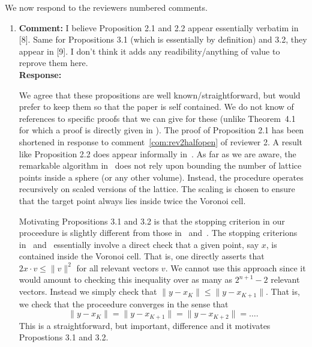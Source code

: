\documentclass[a4paper,10pt]{article}
\begin{document}
We now respond to the reviewers numbered comments.

\begin{enumerate}

\item\textbf{Comment:} 
I believe Proposition 2.1 and 2.2 appear essentially verbatim in [8]. Same for Propositions
3.1 (which is essentially by definition) and 3.2, they appear in [9]. I don’t think it adds any
readibility/anything of value to reprove them here.
\\\textbf{Response:}

We agree that these propositions are well known/straightforward, but would prefer to keep them so that the paper is self contained. We do not know of references to specific proofs that we can give for these (unlike Theorem~4.1 for which a proof is directly given in \cite[Theorem~3]{ConwaySloane1992_voronoi_lattice_3d_obtuse_superbases}).  The proof of Proposition 2.1 has been shortened in response to comment~\ref{com:rev2halfopen} of reviewer 2.  A result like Proposition 2.2 does appear informally in~\cite[Sec~5]{Shalvi_iterativeslicer_2009}.  As far as we are aware, the remarkable algorithm in~\cite{MicciancioVoulgaris_deterministic_jv_2013} does not rely upon bounding the number of lattice points inside a sphere (or any other volume).  Instead, the procedure operates recursively on scaled versions of the lattice.  The scaling is chosen to ensure that the target point always lies inside twice the Voronoi cell. 

Motivating Propositions 3.1 and 3.2 is that the stopping criterion in our proceedure is slightly different from those in~\cite{Shalvi_iterativeslicer_2009} and~\cite{MicciancioVoulgaris_deterministic_jv_2013}.  The stopping criterions in~\cite{Shalvi_iterativeslicer_2009} and~\cite{MicciancioVoulgaris_deterministic_jv_2013} essentially involve a direct check that a given point, say $x$, is contained inside the Voronoi cell.  That is, one directly asserts that $2 x \cdot v \leq \|v\|^2$ for all relevant vectors $v$.  We cannot use this approach since it would amount to checking this inequality over as many as $2^{n+1}-2$ relevant vectors.  Instead we simply check that $\|y - x_K\| \leq \|y - x_{K+1}\|$.  That is, we check that the proceedure converges in the sense that 
\[
\|y - x_K\| = \|y - x_{K+1}\| = \|y - x_{K+2}\| = \dots.
\]
This is a straightforward, but important, difference and it motivates Propostions 3.1 and 3.2.

\newcommand{\rng}{\operatorname{rng}}
\newcommand{\subrng}{\operatorname{subr}}
\newcommand{\decrng}{\operatorname{decrng}}


\end{enumerate}
\end{document}
